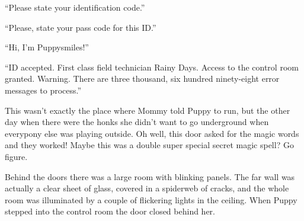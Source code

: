 






{\mten ``Please state your identification code.''}




{\mten ``Please, state your pass code for this ID.''}


``Hi, I'm Puppysmiles!''

{\mten ``ID accepted. First class field technician Rainy Days. Access to the control room granted. Warning. There are three thousand, six hundred ninety-eight error messages to process.''}




This wasn't exactly the place where Mommy told Puppy to run, but the other day when there were the honks she didn't want to go underground when everypony else was playing outside. Oh well, this door asked for the magic words and they worked! Maybe this was a double super special secret magic spell? Go figure.

Behind the doors there was a large room with blinking panels. The far wall was actually a clear sheet of glass, covered in a spiderweb of cracks, and the whole room was illuminated by a couple of flickering lights in the ceiling. When Puppy stepped into the control room the door closed behind her.

